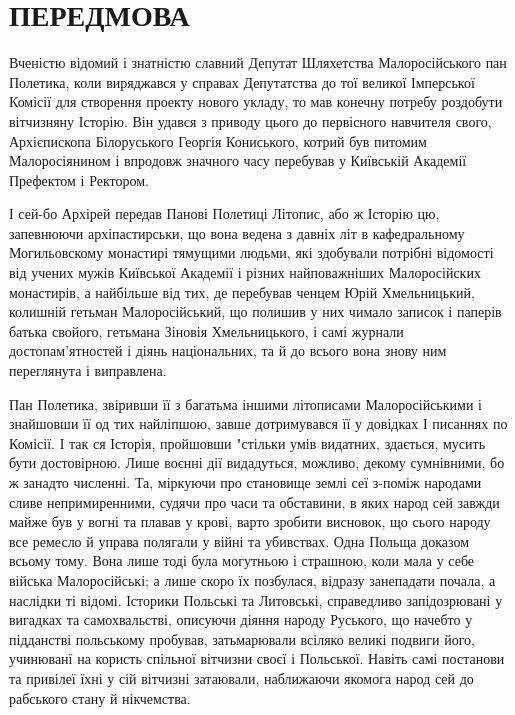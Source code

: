  
 
 
 
 

\section{ПЕРЕДМОВА}
\label{sec:books.istoria_rusiv.preface}




Вченістю відомий і знатністю славний Депутат Шляхетства Малоросійського пан
Полетика, коли виряджався у справах Депутатства до тої великої Імперської
Комісії для створення проекту нового укладу, то мав конечну потребу роздобути
вітчизняну Історію. Він удався з приводу цього до первісного навчителя свого,
Архієпископа Білоруського Георгія Кониського, котрий був питомим Малоросіянином
і впродовж значного часу перебував у Київській Академії Префектом і Ректором.

І сей-бо Архірей передав Панові Полетиці Літопис, або ж Історію цю, запевнюючи
архіпастирськи, що вона ведена з давніх літ в кафедральному Могильовскому
монастирі тямущими людьми, які здобували потрібні відомості від учених мужів
Київської Академії і різних найповажніших Малоросійских монастирів, а найбільше
від тих, де перебував ченцем Юрій Хмельницький, колишній гетьман
Малоросійський, що полишив у них чимало записок і паперів батька свойого,
гетьмана Зіновія Хмельницького, і самі журнали достопам'ятностей і діянь
національних, та й до всього вона знову ним переглянута і виправлена.

Пан Полетика, звіривши її з багатьма іншими літописами Малоросійськими і
знайшовши її од тих найліпшою, завше дотримувався її у довідках І писаннях по
Комісії. І так ся Історія, пройшовши "стільки умів видатних, здається, мусить
бути достовірною. Лише воєнні дії видадуться, можливо, декому сумнівними, бо ж
занадто численні. Та, міркуючи про становище землі сеї з-поміж народами сливе
непримиренними, судячи про часи та обставини, в яких народ сей завжди майже був
у вогні та плавав у крові, варто зробити висновок, що сього народу все ремесло
й управа полягали у війні та убивствах. Одна Польща доказом всьому тому. Вона
лише тоді була могутньою і страшною, коли мала у себе війська Малоросійські; а
лише скоро їх позбулася, відразу занепадати почала, а наслідки ті відомі.
Історики Польські та Литовські, справедливо запідозрювані у вигадках та
самохвальстві, описуючи діяння народу Руського, що начебто у підданстві
польському пробував, затьмарювали всіляко великі подвиги його, учинюванї на
користь спільної вітчизни своєї і Польської. Навіть самі постанови та привілеї
їхні у сій вітчизні затаювали, наближаючи якомога народ сей до рабського стану
й нікчемства. 

